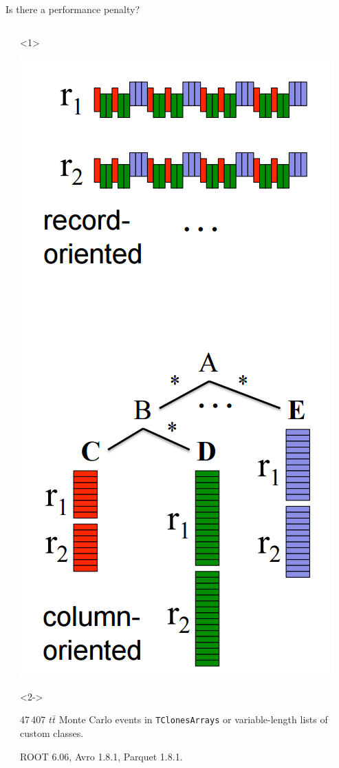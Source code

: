 \documentclass{beamer}
\begin{document}
\begin{frame}{Is there a performance penalty?}
\begin{columns}
\begin{column}{0.55\linewidth}
\begin{itemize}
\end{itemize}
\end{column}
\begin{column}{0.5\linewidth}
\begin{onlyenv}<1>
\begin{center}
\includegraphics[width=0.5\linewidth]{columnar.png}
\end{center}
\vspace{1 cm}
\end{onlyenv}
\begin{onlyenv}<2->
\begin{center}
\begin{minipage}{0.9\linewidth}
\scriptsize 47\,407 $t\bar{t}$ Monte Carlo events in {\tt TClonesArrays} or variable-length lists of custom classes.

\vspace{0.1 cm}
ROOT 6.06, Avro 1.8.1, Parquet 1.8.1.
\end{minipage}


\end{center}
\end{onlyenv}
\end{column}
\end{columns}
\end{frame}
\end{document}
